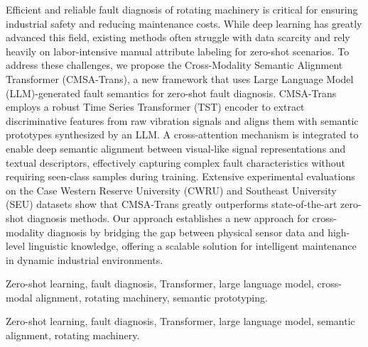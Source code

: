 Efficient and reliable fault diagnosis of rotating machinery is critical for ensuring industrial safety and reducing maintenance costs. While deep learning has greatly advanced this field, existing methods often struggle with data scarcity and rely heavily on labor-intensive manual attribute labeling for zero-shot scenarios. To address these challenges, we propose the Cross-Modality Semantic Alignment Transformer (CMSA-Trans), a new framework that uses Large Language Model (LLM)-generated fault semantics for zero-shot fault diagnosis. CMSA-Trans employs a robust Time Series Transformer (TST) encoder to extract discriminative features from raw vibration signals and aligns them with semantic prototypes synthesized by an LLM. A cross-attention mechanism is integrated to enable deep semantic alignment between visual-like signal representations and textual descriptors, effectively capturing complex fault characteristics without requiring seen-class samples during training. Extensive experimental evaluations on the Case Western Reserve University (CWRU) and Southeast University (SEU) datasets show that CMSA-Trans greatly outperforms state-of-the-art zero-shot diagnosis methods. Our approach establishes a new approach for cross-modality diagnosis by bridging the gap between physical sensor data and high-level linguistic knowledge, offering a scalable solution for intelligent maintenance in dynamic industrial environments.

\begin{IEEEkeywords}
Zero-shot learning, fault diagnosis, Transformer, large language model, cross-modal alignment, rotating machinery, semantic prototyping.
\end{IEEEkeywords}

\begin{IEEEkeywords}
Zero-shot learning, fault diagnosis, Transformer, large language model, semantic alignment, rotating machinery.
\end{IEEEkeywords}
